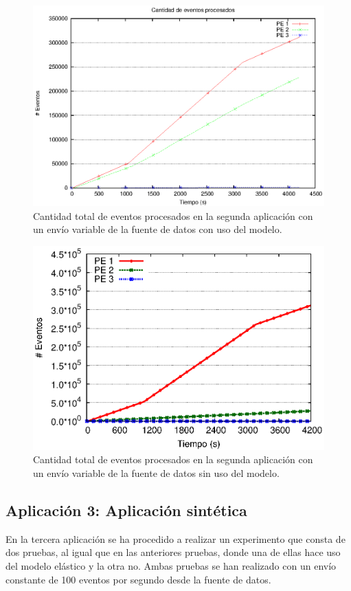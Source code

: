 \begin{figure}[!ht]
	\centering
    \includegraphics[scale=0.7]{images/exp/app2/normal/cm/eventCount.eps}
    \caption{Cantidad total de eventos procesados en la segunda aplicaci\'on con un env\'io variable de la fuente de datos con uso del modelo.}
    \label{fig:app2-normal-eventCount-cm}
\end{figure}

\begin{figure}[!ht]
	\centering
    \includegraphics[scale=0.7]{images/exp/app2/normal/sm/eventCount.eps}
    \caption{Cantidad total de eventos procesados en la segunda aplicaci\'on con un env\'io variable de la fuente de datos sin uso del modelo.}
    \label{fig:app2-normal-eventCount-sm}
\end{figure}

\subsection{Aplicaci\'on 3: Aplicaci\'on sint\'etica}
En la tercera aplicaci\'on se ha procedido a realizar un experimento que consta de dos pruebas, al igual que en las anteriores pruebas, donde una de ellas hace uso del modelo el\'astico y la otra no. Ambas pruebas se han realizado con un env\'io constante de 100 eventos por segundo desde la fuente de datos.

